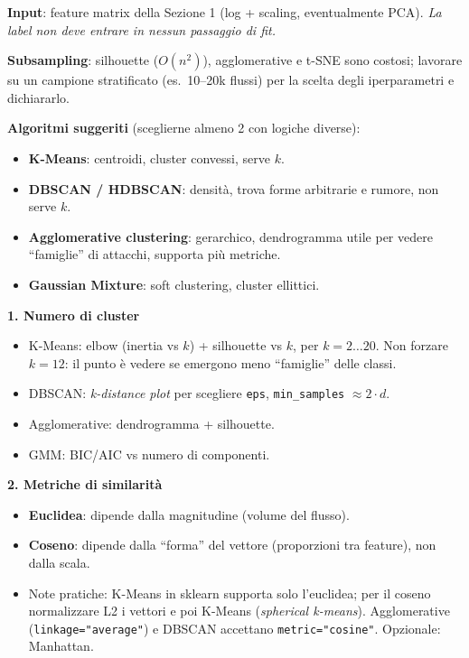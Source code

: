 \begin{strategia}
\textbf{Input}: feature matrix della Sezione 1 (log + scaling, eventualmente
PCA). \emph{La label non deve entrare in nessun passaggio di fit.}

\textbf{Subsampling}: silhouette ($O(n^2)$), agglomerative e t-SNE sono costosi;
lavorare su un campione stratificato (es.\ 10--20k flussi) per la scelta degli
iperparametri e dichiararlo.

\textbf{Algoritmi suggeriti} (sceglierne almeno 2 con logiche diverse):
\begin{itemize}
  \item \textbf{K-Means}: centroidi, cluster convessi, serve $k$.
  \item \textbf{DBSCAN / HDBSCAN}: densità, trova forme arbitrarie e rumore,
        non serve $k$.
  \item \textbf{Agglomerative clustering}: gerarchico, dendrogramma utile per
        vedere ``famiglie'' di attacchi, supporta più metriche.
  \item \textbf{Gaussian Mixture}: soft clustering, cluster ellittici.
\end{itemize}

\textbf{1. Numero di cluster}
\begin{itemize}
  \item K-Means: elbow (inertia vs $k$) + silhouette vs $k$, per
        $k=2\dots20$. Non forzare $k=12$: il punto è vedere se emergono
        meno ``famiglie'' delle classi.
  \item DBSCAN: \emph{k-distance plot} per scegliere \texttt{eps},
        \texttt{min\_samples} $\approx 2\cdot d$.
  \item Agglomerative: dendrogramma + silhouette.
  \item GMM: BIC/AIC vs numero di componenti.
\end{itemize}

\textbf{2. Metriche di similarità}
\begin{itemize}
  \item \textbf{Euclidea}: dipende dalla magnitudine (volume del flusso).
  \item \textbf{Coseno}: dipende dalla ``forma'' del vettore (proporzioni tra
        feature), non dalla scala.
  \item Note pratiche: K-Means in sklearn supporta solo l'euclidea; per il
        coseno normalizzare L2 i vettori e poi K-Means (\emph{spherical
        k-means}). Agglomerative (\texttt{linkage="average"}) e DBSCAN
        accettano \texttt{metric="cosine"}. Opzionale: Manhattan.
\end{itemize}


\end{strategia}
